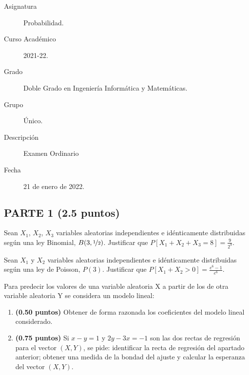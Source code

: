 \documentclass[12pt]{article}
\begin{document}

    
    

    \begin{description}
        \item[Asignatura] Probabilidad.
        \item[Curso Académico] 2021-22.
        \item[Grado] Doble Grado en Ingeniería Informática y Matemáticas.
        \item[Grupo] Único.
        \item[Descripción] Examen Ordinario 
        \item[Fecha] 21 de enero de 2022.
    
    \end{description}
    \newpage

    \subsection*{PARTE 1 (2.5 puntos)}
    \begin{ejercicio}[0.25 puntos]
        Sean $X_1$, $X_2$, $X_3$ variables aleatorias independientes e idénticamente distribuidas según una ley Binomial, $B(3,\nicefrac{1}{2})$. Justificar que $P[X_1 + X_2 + X_3 = 8] = \frac{9}{2^9} $.
    \end{ejercicio}

    \begin{ejercicio}[0.25 puntos]
        Sean $X_1$ y $X_2$ variables aleatorias independientes e idénticamente distribuidas según una ley de Poisson, $P(3)$. Justificar que $P[X_1 + X_2 > 0] = \frac{e^6 - 1}{e^6}$.
    \end{ejercicio}

    \begin{ejercicio}
        Para predecir los valores de una variable aleatoria X a partir de los de otra variable aleatoria Y se considera un modelo lineal:
        \begin{enumerate}[label=\alph*)]
            \item \textbf{(0.50 puntos)} Obtener de forma razonada los coeficientes del modelo lineal considerado.
            \item \textbf{(0.75 puntos)} Si $x-y=1$ y $2y-3x=-1$ son las dos rectas de regresión para el vector $(X,Y)$, se pide: identificar la recta de regresión del apartado anterior; obtener una medida de la bondad del ajuste y calcular la esperanza del vector $(X,Y)$.
        \end{enumerate}
    \end{ejercicio}
\end{document}
